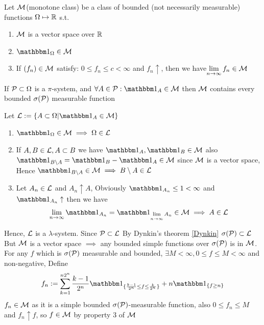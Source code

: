 \begin{thm}
\label{Monotonclass} Let $\mathcal{M}$(monotone class) be a class of bounded (not necessarily measurable) functions $\Omega \mapsto \mathbb{R}$ s.t. 
\begin{enumerate}
    \item $\mathcal{M}$ is a vector space over $\mathbb{R}$
    \item $\I_\Omega \in \M$
    \item If $(f_n) \in \mathcal{M}$ satisfy: $0\leq f_n\leq c <\infty$ and $f_n \uparrow$, then we have$\lim\limits_{n\rightarrow\infty}f_n \in \mathcal{M}$
\end{enumerate}
If $\mathcal{P} \subset \Omega$ is a $\pi$-system, and $\forall A \in \setp: \I_A \in \M$ then $\mathcal{M}$ contains every bounded $\sigma(\mathcal{P})$ measurable function
\end{thm}
\newpage
\pf Let $\setl :=\{A\subset\Omega| \I_A \in \M\}$
\begin{enumerate}
    \item $\I_\Omega \in \M \implies \Omega \in \setl$
    \item If $A,B \in \mathcal{L}, A\subset B$ we have $\I_A, \I_B \in \M$ also $\I_{B\setminus A} = \I_B - \I_A \in \M$ since $\mathcal{M}$ is a vector space, Hence $\I_{B\setminus A}\in \M \implies B\setminus A \in \setl$
    \item Let $A_n\in \mathcal{L}$ and $A_n \uparrow A$, Obviously $\I_{A_n} \leq 1< \infty$ and $\I_{A_n} \uparrow$ then we have \begin{equation*}
        \biglim{n\rightarrow\infty}\I_{A_n} = \I_{\biglim{n\rightarrow\infty}A_n} \in \M \implies A\in \setl
    \end{equation*}
\end{enumerate}Hence, $\mathcal{L}$ is a $\lambda$-system. Since $\mathcal{P} \subset \mathcal{L}$ By Dynkin's theorem \ref{Dynkin} $\sigma(\mathcal{P}) \subset \mathcal{L}$ \\
But $\mathcal{M}$ is a vector space $\implies $ any bounded simple functions over  $\sigma(\mathcal{P})$ is in $\mathcal{M}$.\\
For any $f$ which is $\sigma(\mathcal{P})$ measurable and bounded, $\exists M < \infty, 0 \leq f \leq M < \infty$ and non-negative, Define
\begin{equation*}
    f_n := \bigs{k=1}^{n 2^n} \frac{k-1}{2^n} \I_{\{\frac{k-1}{2^n} \leq f \leq \frac{k}{2^n}\}} + n \I_{\{f\geq n\}}
\end{equation*}$f_n \in \mathcal{M}$ as it is a simple bounded $\sigma(\mathcal{P})$-measurable function, also $0\leq f_n \leq M$ and $f_n \uparrow f$, so $f \in \mathcal{M}$ by property 3 of $\mathcal{M}$ \\
